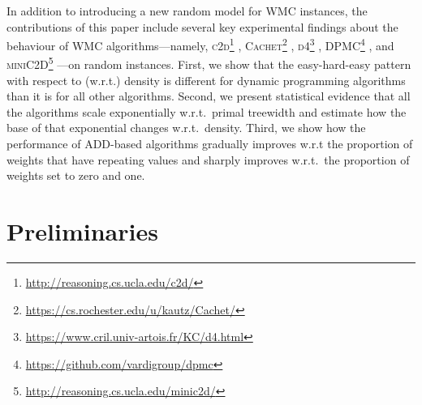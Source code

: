 In addition to introducing a new random model for \textsf{WMC} instances, the
contributions of this paper include several key experimental findings about the
behaviour of \textsf{WMC} algorithms---namely,
\textsc{c2d}\footnote{\url{http://reasoning.cs.ucla.edu/c2d/}} \citep{DBLP:conf/ecai/Darwiche04},
\textsc{Cachet}\footnote{\url{https://cs.rochester.edu/u/kautz/Cachet/}} \citep{DBLP:conf/sat/SangBBKP04},
\textsc{d4}\footnote{\url{https://www.cril.univ-artois.fr/KC/d4.html}} \citep{DBLP:conf/ijcai/LagniezM17},
\textsc{DPMC}\footnote{\url{https://github.com/vardigroup/dpmc}} \citep{DBLP:conf/cp/DudekPV20},
and
\textsc{miniC2D}\footnote{\url{http://reasoning.cs.ucla.edu/minic2d/}} \citep{DBLP:conf/ijcai/OztokD15}---on
random instances. First, we show that the easy-hard-easy pattern with respect to
(w.r.t.) density is different for dynamic programming algorithms than it is for
all other algorithms. Second, we present statistical evidence that all the
algorithms scale exponentially w.r.t.\ primal treewidth and estimate how the
base of that exponential changes w.r.t.\ density. Third, we show how the
performance of ADD-based algorithms gradually improves w.r.t the proportion of
weights that have repeating values and sharply improves w.r.t.\ the proportion
of weights set to zero and one.


\section{Preliminaries}

